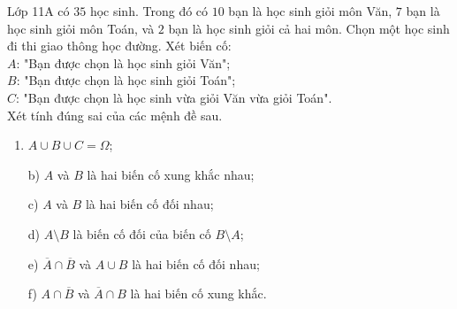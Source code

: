 \begin{bt}%
		Lớp 11A có $35$ học sinh. Trong đó có $10$ bạn là học sinh giỏi môn Văn, $7$ bạn là học sinh giỏi môn Toán,  và $2$ bạn là học sinh giỏi cả hai môn. Chọn một học sinh đi thi giao thông học đường. Xét biến cố: \\
		$A$: "Bạn được chọn là học sinh giỏi Văn";\\
		$B$: "Bạn được chọn là học sinh giỏi Toán";\\
		$C$: "Bạn được chọn là học sinh vừa giỏi Văn vừa giỏi Toán".\\
		Xét tính đúng sai của các mệnh đề sau.
		\begin{enumerate}
			\item $A \cup B \cup C = \Omega$;
			\item[b)] $A$ và $B$ là hai biến cố xung khắc nhau;
			\item[c)] $A$ và $B$ là hai biến cố đối nhau;
			\item[d)] $A \setminus B$ là biến cố đối của biến cố $B \setminus A$;
			\item[e)] $\overline{A} \cap \overline{B}$ và $A \cup B$ là hai biến cố đối nhau;
			\item[f)] $A \cap \overline{B}$ và $\overline{A} \cap B$ là hai biến cố xung khắc.
		\end{enumerate}
\end{bt}
